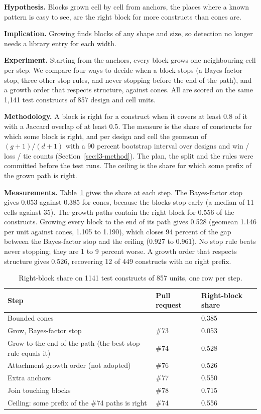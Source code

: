 \documentclass[conference]{IEEEtran}
\newcommand{\hev}[1]{\par\smallskip\noindent\textbf{#1}}
\begin{document}
\hev{Hypothesis.} Blocks grown cell by cell from anchors, the places where a known pattern is easy to see, are the right block for more constructs than cones are.

\hev{Implication.} Growing finds blocks of any shape and size, so detection no longer needs a library entry for each width.

\hev{Experiment.} Starting from the anchors, every block grows one neighbouring cell per step. We compare four ways to decide when a block stops (a Bayes-factor stop, three other stop rules, and never stopping before the end of the path), and a growth order that respects structure, against cones. All are scored on the same 1,141 test constructs of 857 design and cell units.

\hev{Methodology.} A block is right for a construct when it covers at least 0.8 of it with a Jaccard overlap of at least 0.5. The measure is the share of constructs for which some block is right, and per design and cell the geomean of $(g+1)/(d+1)$ with a 90 percent bootstrap interval over designs and win / loss / tie counts (Section~\ref{sec:l3-method}). The plan, the split and the rules were committed before the test runs. The ceiling is the share for which some prefix of the grown path is right.

\hev{Measurements.} Table~\ref{tab:steps} gives the share at each step. The Bayes-factor stop gives 0.053 against 0.385 for cones, because the blocks stop early (a median of 11 cells against 35). The growth paths contain the right block for 0.556 of the constructs. Growing every block to the end of its path gives 0.528 (geomean 1.146 per unit against cones, 1.105 to 1.190), which closes 94 percent of the gap between the Bayes-factor stop and the ceiling (0.927 to 0.961). No stop rule beats never stopping; they are 1 to 9 percent worse. A growth order that respects structure gives 0.526, recovering 12 of 449 constructs with no right prefix.

\begin{table}[t]
\caption{Right-block share on 1141 test constructs of 857 units, one row per step.}
\label{tab:steps}
\centering
\footnotesize
\begin{tabular}{@{}p{}p{}p{}@{}}
\toprule
Step & Pull request & Right-block share \\
\midrule
Bounded cones & & 0.385 \\
Grow, Bayes-factor stop & \#73 & 0.053 \\
Grow to the end of the path (the best stop rule equals it) & \#74 & 0.528 \\
Attachment growth order (not adopted) & \#76 & 0.526 \\
Extra anchors & \#77 & 0.550 \\
Join touching blocks & \#78 & 0.715 \\
\midrule
Ceiling: some prefix of the \#74 paths is right & \#74 & 0.556 \\
\bottomrule
\end{tabular}
\end{table}
\end{document}
